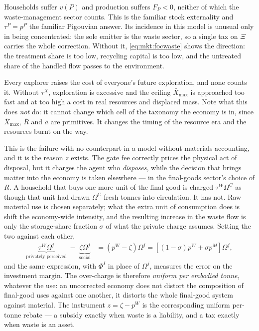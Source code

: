  Households suffer $v\left(P\right)$ and production suffers $F_P<0$, neither of which the waste-management sector counts. This is the familiar stock externality and $\tau^P=p^P$ the familiar Pigouvian answer. Its incidence in this model is unusual only in being concentrated: the sole emitter is the waste sector, so a single tax on $\Xi$ carries the whole correction. Without it, \eqref{eq:mkt:focwaste} shows the direction: the treatment share is too low, recycling capital is too low, and the untreated share of the handled flow passes to the environment.

 Every explorer raises the cost of everyone's future exploration, and none counts it. Without $\tau^X$, exploration is excessive and the ceiling $\bar X_{\max}$ is approached too fast and at too high a cost in real resources and displaced mass. Note what this does \emph{not} do: it cannot change which cell of the taxonomy the economy is in, since $\bar X_{\max}$, $\bar R$ and $\bar a$ are primitives. It changes the timing of the resource era and the resources burnt on the way.

 This is the failure with no counterpart in a model without materials accounting, and it is the reason $z$ exists. The gate fee correctly prices the physical act of disposal, but it charges the agent who \emph{disposes}, while the decision that brings matter into the economy is taken elsewhere --- in the final-goods sector's choice of $R$. A household that buys one more unit of the final good is charged $\tau^W\Omega^C$ as though that unit had drawn $\Omega^C$ fresh tonnes into circulation. It has not. Raw material use is chosen separately; what the extra unit of consumption does is shift the economy-wide intensity, and the resulting increase in the waste flow is only the storage-share fraction $\sigma$ of what the private charge assumes. Setting the two against each other,
\begin{align}
\underbrace{\tau^W\Omega^j}_{\text{privately perceived}}
\;-\;
\underbrace{\zeta\Omega^j}_{\text{social}}
&= \left(p^W-\zeta\right)\Omega^j
= \left[\left(1-\sigma\right)p^W+\sigma p^M\right]\Omega^j ,
\label{eq:mkt:attribution}
\end{align}
and the same expression, with $\Phi^I$ in place of $\Omega^j$, measures the error on the investment margin. The over-charge is therefore \emph{uniform per embodied tonne}, whatever the use: an uncorrected economy does not distort the composition of final-good uses against one another, it distorts the whole final-good system against material. The instrument $z=\zeta-p^W$ is the corresponding uniform per-tonne rebate --- a subsidy exactly when waste is a liability, and a tax exactly when waste is an asset.

